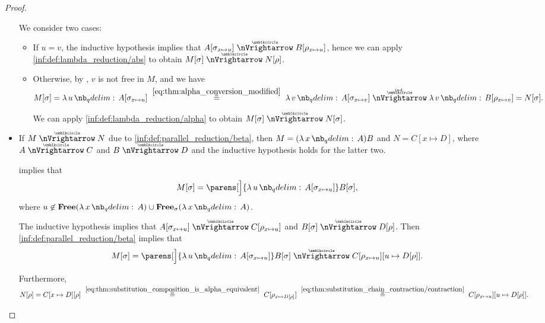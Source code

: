\begin{proof}
\begin{itemize}
    We consider two cases:
    \begin{itemize}
      \item If \( u = v \), the inductive hypothesis implies that \( A[\sigma_{x \mapsto u}] \ppred B[\rho_{x \mapsto u}] \), hence we can apply \ref{inf:def:lambda_reduction/abs} to obtain \( M[\sigma] \ppred N[\rho] \).

      \item Otherwise, by , \( v \) is not free in \( M \), and we have
      \begin{equation*}
        M[\sigma]
        =
        \qabs u A[\sigma_{x \mapsto u}]
        \reloset {\eqref{eq:thm:alpha_conversion_modified}} \aequiv
        \qabs v A[\sigma_{x \mapsto v}]
        \reloset {\T{ind.}} \ppred
        \qabs v B[\rho_{x \mapsto v}]
        =
        N[\sigma].
      \end{equation*}

      We can apply \ref{inf:def:lambda_reduction/alpha} to obtain \( M[\sigma] \ppred N[\sigma] \).
    \end{itemize}

    \item If \( M \ppred N \) due to \ref{inf:def:parallel_reduction/beta}, then \( M = (\qabs x A)B \) and \( N = C[x \mapsto D] \), where \( A \ppred C \) and \( B \ppred D \) and the inductive hypothesis holds for the latter two.

     implies that
    \begin{equation*}
      M[\sigma] = \parens[\Big]{ \qabs u A[\sigma_{x \mapsto u}] } B[\sigma],
    \end{equation*}
    where \( u \not\in \op*{Free}(\qabs x A) \cup \op*{Free}_\sigma(\qabs x A) \).

    The inductive hypothesis implies that \( A[\sigma_{x \mapsto u}] \ppred C[\rho_{x \mapsto u}] \) and \( B[\sigma] \ppred D[\rho] \). Then \ref{inf:def:parallel_reduction/beta} implies that
    \begin{equation*}
      M[\sigma]
      =
      \parens[\Big]{ \qabs u A[\sigma_{x \mapsto u}] } B[\sigma]
      \ppred
      C[\rho_{x \mapsto u}][u \mapsto D[\rho]].
    \end{equation*}

    Furthermore,
    \begin{equation*}
      N[\rho]
      =
      C[x \mapsto D][\rho]
      \reloset {\eqref{eq:thm:substitution_composition_is_alpha_equivalent}} \aequiv
      C[\rho_{x \mapsto D[\rho]}]
      \reloset {\eqref{eq:thm:substitution_chain_contraction/contraction}} \aequiv
      C[\rho_{x \mapsto u}][u \mapsto D[\rho]].
    \end{equation*}


\end{itemize}
\end{proof}
